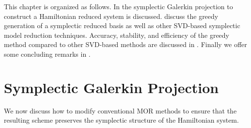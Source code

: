 This chapter is organized as follows. In  the symplectic Galerkin projection to construct a Hamiltonian reduced system is discussed.   discuss the greedy generation of a symplectic reduced basis as well as other SVD-based symplectic model reduction techniques. Accuracy, stability, and efficiency of the greedy method compared to other SVD-based methods are discussed in . Finally we offer some concluding remarks in .


\section{Symplectic Galerkin Projection} \label{p1.sec:SyMo:1}
We now discuss how to modify conventional MOR methods to ensure that the resulting scheme preserves the symplectic structure of the Hamiltonian system. 

